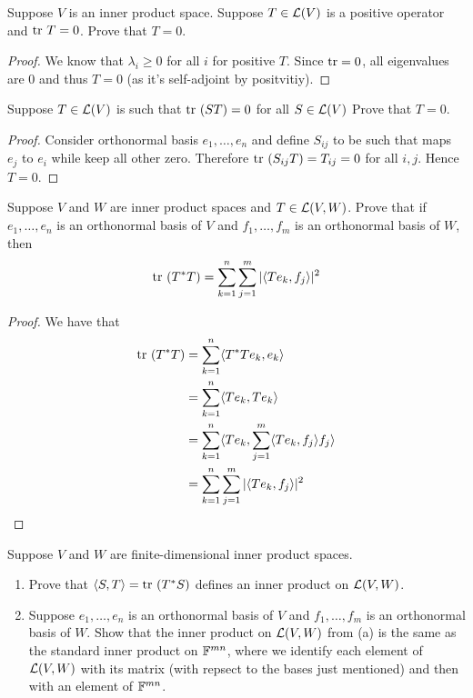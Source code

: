 \documentclass{extarticle}
\begin{document}
\begin{problem}{5}
    Suppose \(V\) is an inner product space. Suppose \(T \in \mathcal{L}(V)\) is a positive operator and 
    \(\text{tr} \ T = 0\). Prove that \(T = 0\).
\end{problem}

\begin{proof}
We know that \(\lambda_i \geq 0\) for all \(i\) for positive \(T\). Since \(\text{tr} = 0\), all eigenvalues 
are 0 and thus \(T = 0\) (as it's self-adjoint by positvitiy).
\end{proof}

\begin{problem}{9}
    Suppose \(T \in \mathcal{L}(V)\) is such that \(\text{tr} \ (ST) = 0\) for all \(S \in \mathcal{L}(V)\) Prove that \(T = 0\).
\end{problem}

\begin{proof}
Consider orthonormal basis \(e_1, \ldots, e_n\) and define \(S_{ij}\) to be such that 
maps \(e_j\) to \(e_i\) while keep all other zero. Therefore \(\tr \ (S_{ij}T) = T_{ij} = 0\) 
for all \(i, j\). Hence \(T = 0\).
\end{proof}


\begin{problem}{11}
    Suppose \(V\) and \(W\) are inner product spaces and \(T \in \mathcal{L}(V, W)\). Prove that if \(e_1, \ldots, e_n\)
    is an orthonormal basis of \(V\) and \(f_1, \ldots, f_m\) is an orthonormal basis of \(W\), then 
    \[\text{tr} \ (T^* T) = \sum_{k=1}^{n} \sum_{j=1}^m |\langle T e_k,f_j \rangle|^2\]
\end{problem}

\begin{proof}
We have that 
\begin{align*}
    \text{tr} \ (T^* T) 
    &= \sum_{k=1}^{n} \langle T^* T e_k,e_k \rangle \\ 
    &= \sum_{k=1}^{n} \langle T e_k, T e_k \rangle \\ 
    &= \sum_{k=1}^{n} \langle T e_k, \sum_{j=1}^{m} \langle Te_k,f_j \rangle f_j \rangle \\ 
    &= \sum_{k=1}^{n} \sum_{j=1}^{m} |\langle T e_k,f_j \rangle|^2
\end{align*}
\end{proof}


\begin{problem}{12}
    Suppose \(V\) and \(W\) are finite-dimensional inner product spaces. 
    \begin{enumerate}[label=(\alph*)]
        \item Prove that \(\langle S,T \rangle = \tr \ (T^* S)\) defines an inner product on \(\mathcal{L}(V, W)\). 
        \item Suppose \(e_1, \ldots, e_n\) is an orthonormal basis of \(V\) and \(f_1, \ldots, f_m\) 
        is an orthonormal basis of \(W\). Show that the inner product on \(\mathcal{L}(V, W)\) from (a) is the same 
        as the standard inner product on \(\mathbb{F}^{mn}\), where we identify each element of \(\mathcal{L}(V, W)\) with 
        its matrix (with repsect to the bases just mentioned) and then with an element of \(\mathbb{F}^{mn}\). 
    \end{enumerate}
\end{problem}
\end{document}
